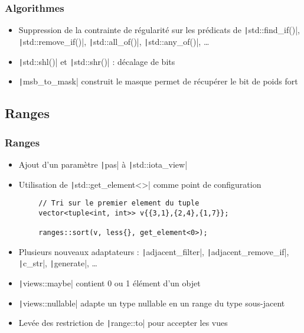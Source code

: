 \documentclass[C++.tex]{subfiles}
\begin{document}
\begin{frame}[fragile]
	\frametitle{Algorithmes}
	\begin{itemize}
		\item Suppression de la contrainte de régularité sur les prédicats de \texttt|std::find_if()|, \texttt|std::remove_if()|, \texttt|std::all_of()|, \texttt|std::any_of()|, \ldots


		\item \texttt|std::shl()| et \texttt|std::shr()| : décalage de bits
		\item \texttt|msb_to_mask| construit le masque permet de récupérer le bit de poids fort
	\end{itemize}

\end{frame}

\subsection*{Ranges}
\begin{frame}[fragile]
	\frametitle{Ranges}
	\begin{itemize}
		\item Ajout d'un paramètre \texttt|pas| à \texttt|std::iota_view|
		\item Utilisation de \texttt|std::get_element<>| comme point de configuration
	\end{itemize}

	\begin{verbatim}
		// Tri sur le premier element du tuple
		vector<tuple<int, int>> v{{3,1},{2,4},{1,7}};

		ranges::sort(v, less{}, get_element<0>);
	\end{verbatim}

	\begin{itemize}
		\item Plusieurs nouveaux adaptateurs : \texttt|adjacent_filter|, \texttt|adjacent_remove_if|, \texttt|c_str|, \texttt|generate|, \ldots
		\item \texttt|views::maybe| contient 0 ou 1 élément d'un objet
		\item \texttt|views::nullable| adapte un type nullable en un range du type sous-jacent
		\item Levée des restriction de \texttt|range::to| pour accepter les vues
	\end{itemize}

\end{frame}
\end{document}
